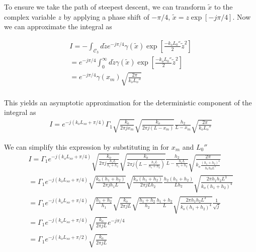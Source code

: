 To ensure we take the path of steepest descent, we can transform $\tilde{x}$ to the complex variable $z$ by applying a phase shift of $-\pi/4$, $\tilde{x} = z\exp[-j\pi/4]$. Now we can approximate the integral as

\begin{equation}
\begin{gathered}
I = -\int_{\mathcal{C}_3}d\tilde{z}e^{-j\pi/4} \gamma(\tilde{x})\exp\left[\frac{-k_oL_0''}{2}\tilde{z}^2\right]  \\
= e^{-j\pi/4}\int_{0}^{\infty}d\tilde{z}\gamma(\tilde{x})\exp\left[\frac{-k_oL_0''}{2}\tilde{z}^2\right]  \\
= e^{-j\pi/4}\gamma(x_m)\sqrt{\frac{2\pi}{k_oL_o''}} \\
\end{gathered}
\label{mp_eq:25}
\end{equation}

This yields an asymptotic approximation for the deterministic component of the integral as
\begin{equation}
\begin{gathered}
I = e^{-j\left(k_oL_{so}+\pi/4\right)}\Gamma_1 \sqrt{\frac{k_o}{2\pi jx_m}}\sqrt{\frac{k_o}{2\pi j (L-x_m)}}\frac{h_2}{L-x_m}\sqrt{\frac{2\pi}{k_oL_o''}} 
\end{gathered}
\label{mp_eq:26}
\end{equation}

We can simplify this expression by substituting in for $x_m$ and $L_0''$
\begin{equation}
\begin{gathered}
I= \Gamma_1e^{-j\left(k_oL_{so}+\pi/4\right)}\sqrt{\frac{k_o}{2\pi j\frac{h_1L}{h_1+h_2}}}\sqrt{\frac{k_o}{2\pi j (L-\frac{h_1L}{h_1+h_2})}}\frac{h_2}{L-\frac{h_1L}{h_1+h_2}}\sqrt{\frac{2\pi}{k_o\frac{(h_1+h_2)^4}{h_1h_2L^3}}} \\
= \Gamma_1e^{-j\left(k_oL_{so}+\pi/4\right)} \sqrt{\frac{k_o(h_1+h_2)}{2\pi jh_1L}}\sqrt{\frac{k_o(h_1+h_2)}{2\pi jLh_2}}\frac{h_2(h_1+h_2)}{Lh_2}\sqrt{\frac{2\pi h_1h_2L^3}{k_o(h_1+h_2)^4}} \\
= \Gamma_1e^{-j\left(k_oL_{so}+\pi/4\right)}  \sqrt{\frac{h_1+h_2}{h_1}}\sqrt{\frac{k_o}{2\pi j L}}\sqrt{\frac{h_1+h_2}{h_2}}\frac{h_1+h_2}{L}\sqrt{\frac{2\pi h_1h_2L^3}{k_o(h_1+h_2)^4}}\frac{1}{\sqrt{j}} \\
= \Gamma_1e^{-j\left(k_oL_{so}+\pi/4\right)}\sqrt{\frac{k_o}{2\pi jL}}e^{-j\pi/4} \\
= \Gamma_1e^{-j\left(k_oL_{so}+\pi/2\right)}\sqrt{\frac{k_o}{2\pi jL}} \\
\end{gathered}
\label{mp_eq:27}
\end{equation}

